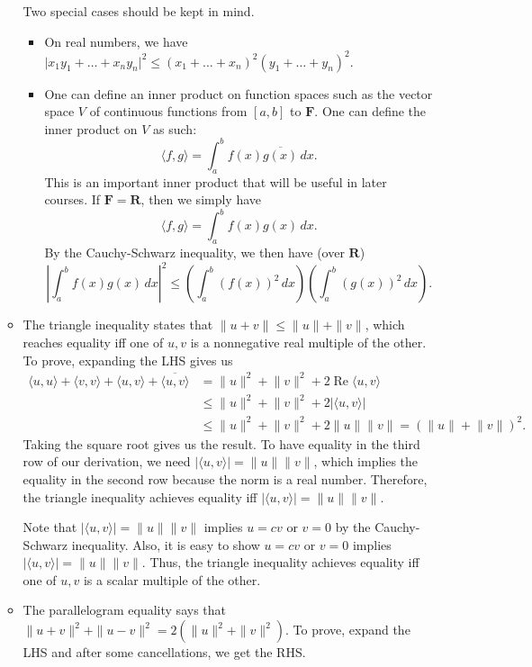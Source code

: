 \documentclass[11pt]{article}
\newcommand{\R}{\mathbf{R}}
\newcommand{\F}{\mathbf{F}}
\renewcommand{\Re}{\operatorname{Re}}
\newcommand{\conj}[1]{\overline{#1}}
\newcommand{\inp}[2]{\langle #1, #2 \rangle}
\newcommand{\nm}[1]{\lVert #1 \rVert}
\newcommand{\abs}[1]{\lvert #1 \rvert}
\newcommand{\dx}{\,dx}
\begin{document}
\begin{itemize}
\begin{itemize}
        Two special cases should be kept in mind.
        \begin{itemize}
            \item On real numbers, we have $\abs{x_1y_1+\dots+x_ny_n}^2 \leq (x_1+\dots+x_n)^2(y_1+\dots+y_n)^2$.
            \item One can define an inner product on function spaces such as the vector space $V$ of continuous functions from $[a,b]$ to $\F$. One can define the inner product on $V$ as such: $$\inp{f}{g} = \int_a^b f(x)\conj{g(x)} \dx.$$ This is an important inner product that will be useful in later courses. If $\F = \R$, then we simply have $$\inp{f}{g} = \int_a^b f(x)g(x) \dx.$$ By the Cauchy-Schwarz inequality, we then have (over $\R$) \[\left\lvert\int_a^b f(x)g(x) \dx\right\rvert ^2 \leq \left(\int_a^b (f(x))^2 \dx \right) \left(\int_a^b (g(x))^2 \dx \right).\]
        \end{itemize}
        \item The triangle inequality states that $\|u+v\| \leq \|u\|+\|v\|$, which reaches equality iff one of $u,v$ is a nonnegative real multiple of the other.
        To prove, expanding the LHS gives us
        \begin{align*}
            \inp{u}{u}+\inp{v}{v}+\inp{u}{v}+\conj{\inp{u}{v}} & = \nm{u}^2+\nm{v}^2+2 \Re{\inp{u}{v}} \\ & \leq \nm{u}^2+\nm{v}^2+2\abs{\inp{u}{v}} \\ & \leq \nm{u}^2+\nm{v}^2+2\nm{u}\nm{v} = (\nm{u}+\nm{v})^2.
        \end{align*}
        Taking the square root gives us the result. To have equality in the third row of our derivation, we need $\abs{\inp{u}{v}} = \nm{u}\nm{v}$, which implies the equality in the second row because the norm is a real number. Therefore, the triangle inequality achieves equality iff $\abs{\inp{u}{v}} = \nm{u}\nm{v}$.
        
        Note that $\abs{\inp{u}{v}} = \nm{u}\nm{v}$ implies $u=cv$ or $v=0$ by the Cauchy-Schwarz inequality. Also, it is easy to show $u=cv$ or $v=0$ implies $\abs{\inp{u}{v}} = \nm{u}\nm{v}$. Thus, the triangle inequality achieves equality iff one of $u,v$ is a scalar multiple of the other.
        \item The parallelogram equality says that $\|u+v\|^2+\|u-v\|^2 = 2(\|u\|^2+ \|v\|^2)$. To prove, expand the LHS and after some cancellations, we get the RHS.
    \end{itemize}
\end{itemize}
\end{document}
